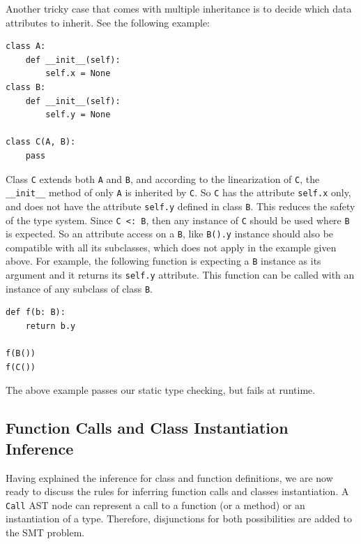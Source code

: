 Another tricky case that comes with multiple inheritance is to decide which data attributes to inherit. See the following example:

\begin{lstlisting}
class A:
	def __init__(self):
		self.x = None
class B:
	def __init__(self):
		self.y = None

class C(A, B):
	pass
\end{lstlisting}

Class \lstinline|C| extends both \lstinline|A| and \lstinline|B|, and according to the linearization of \lstinline|C|, the \lstinline|__init__| method of only \lstinline|A| is inherited by \lstinline|C|. So \lstinline|C| has the attribute \lstinline|self.x| only, and does not have the attribute \lstinline|self.y| defined in class \lstinline|B|. This reduces the safety of the type system. Since \lstinline|C <: B|, then any instance of \lstinline|C| should be used where \lstinline|B| is expected. So an attribute access on a \lstinline|B|, like \lstinline|B().y| instance should also be compatible with all its subclasses, which does not apply in the example given above. For example, the following function is expecting a \lstinline|B| instance as its argument and it returns its \lstinline|self.y| attribute. This function can be called with an instance of any subclass of class \lstinline|B|.
\begin{lstlisting}
def f(b: B):
	return b.y
	
f(B())
f(C()) 
\end{lstlisting}

The above example passes our static type checking, but fails at runtime.
\subsection{Function Calls and Class Instantiation Inference}
Having explained the inference for class and function definitions, we are now ready to discuss the rules for inferring function calls and classes instantiation. A \lstinline|Call| AST node can represent a call to a function (or a method) or an instantiation of a type. Therefore, disjunctions for both possibilities are added to the SMT problem.


